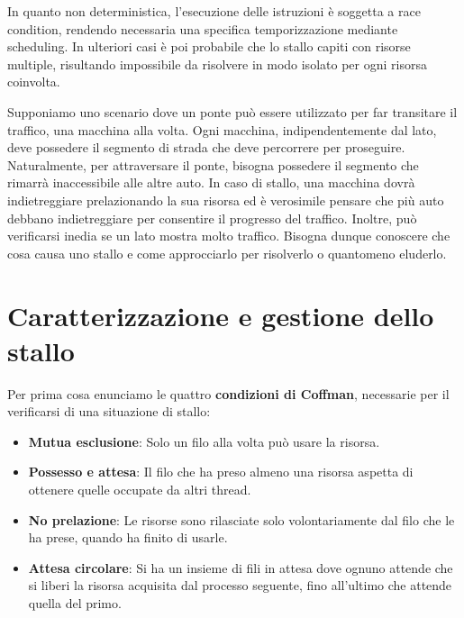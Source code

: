 \noindent In quanto non deterministica, l'esecuzione delle istruzioni è soggetta a race condition, rendendo necessaria una specifica temporizzazione
mediante scheduling. In ulteriori casi è poi probabile che lo stallo capiti con risorse multiple, risultando impossibile da risolvere in modo isolato
per ogni risorsa coinvolta.\par
Supponiamo uno scenario dove un ponte può essere utilizzato per far transitare il traffico, una macchina alla volta. Ogni macchina, indipendentemente
dal lato, deve possedere il segmento di strada che deve percorrere per proseguire. Naturalmente, per attraversare il ponte, bisogna possedere il
segmento che rimarrà inaccessibile alle altre auto. In caso di stallo, una macchina dovrà indietreggiare prelazionando la sua risorsa ed è verosimile
pensare che più auto debbano indietreggiare per consentire il progresso del traffico. Inoltre, può verificarsi inedia se un lato mostra molto traffico.
Bisogna dunque conoscere che cosa causa uno stallo e come approcciarlo per risolverlo o quantomeno eluderlo.

%

\section{Caratterizzazione e gestione dello stallo}
Per prima cosa enunciamo le quattro \textbf{condizioni di Coffman}, necessarie per il verificarsi di una situazione di stallo: \begin{itemize}
    \item \textbf{Mutua esclusione}: Solo un filo alla volta può usare la risorsa.
    \item \textbf{Possesso e attesa}: Il filo che ha preso almeno una risorsa aspetta di ottenere quelle occupate da altri thread.
    \item \textbf{No prelazione}: Le risorse sono rilasciate solo volontariamente dal filo che le ha prese, quando ha finito di usarle.
    \item \textbf{Attesa circolare}: Si ha un insieme di fili in attesa dove ognuno attende che si liberi la risorsa acquisita dal processo seguente,
    fino all'ultimo che attende quella del primo.
\end{itemize}

